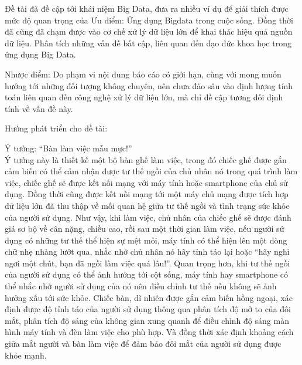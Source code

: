 \documentclass[12pt]{report}
\begin{document}
Đề tài đã đề cập tới khái niệm Big Data, đưa ra nhiều ví dụ để giải thích được mức độ quan trọng của Ưu điểm: Ứng dụng Bigdata trong cuộc sống. Đồng thời đã cũng đã chạm được vào cơ chế xử lý dữ liệu lớn để khai thác hiệu quả nguồn dữ liệu. Phân tích những vấn đề bất cập, liên quan đến đạo đức khoa học trong ứng dụng Big Data. 

Nhược điểm: Do phạm vi nội dung báo cáo có giới hạn, cùng với mong muốn hướng tới những đối tượng không chuyên, nên chưa đào sâu vào định lượng tính toán liên quan đến công nghệ xử lý dữ liệu lớn, mà chỉ đề cập tương đối định tính về vấn đề này.

Hướng phát triển cho đề tài: 

Ý tưởng: “Bàn làm việc mẫu mực!” \\
Ý tưởng này là thiết kế một bộ bàn ghế làm việc, trong đó chiếc ghế được gắn cảm biến có thể cảm nhận được tư thế ngồi của chủ nhân nó trong quá trình làm việc, chiếc ghế sẽ được kết nối mạng với máy tính hoặc smartphone của chủ sử dụng. Đồng thời cũng được kết nối mạng tới một máy chủ mạng được tích hợp dữ liệu lớn đã thu thập về mối quan hệ giữa tư thế ngồi và tình trạng sức khỏe của người sử dụng. Như vậy, khi làm việc, chủ nhân của chiếc ghế sẽ được đánh giá sơ bộ về cân nặng, chiều cao, rồi sau một thời gian làm việc, nếu người sử dụng có những tư thế thể hiện sự mệt mỏi, máy tính có thể hiện lên một dòng chữ nhẹ nhàng lướt qua, nhắc nhở chủ nhân nó hãy tỉnh táo lại hoặc “hãy nghỉ ngơi một chút, bạn đã ngồi làm việc quá lâu!”. Quan trọng hơn, khi tư thế ngồi của người sử dụng có thể ảnh hưởng tới cột sống, máy tính hay smartphone có thể nhắc nhở người sử dụng của nó nên điều chỉnh tư thế nếu không sẽ ảnh hưởng xấu tới sức khỏe. Chiếc bàn, dĩ nhiên được gắn cảm biến hồng ngoại, xác định được độ tỉnh táo của người sử dụng thông qua phân tích độ mở to của đôi mắt, phân tích độ sáng của không gian xung quanh để điều chỉnh độ sáng màn hình máy tính và đèn làm việc cho phù hợp. Và đồng thời xác định khoảng cách giữa mắt người và bàn làm việc để đảm bảo đôi mắt của người sử dụng được khỏe mạnh.
\end{document}
